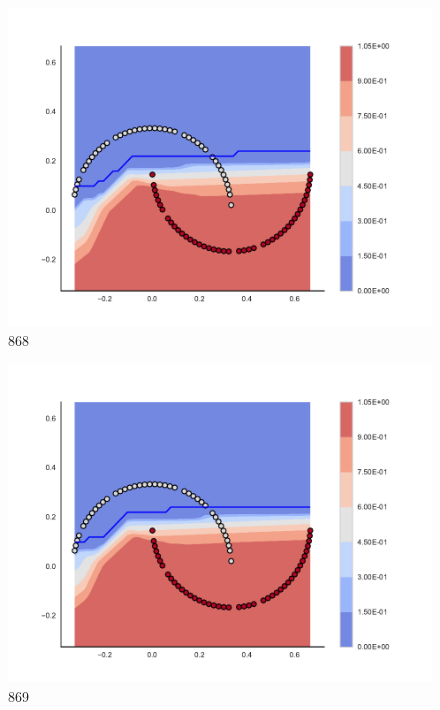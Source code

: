 \begin{subfigure}[b]{0.09\textwidth}
    \includegraphics[clip, trim=2.35cm 1.75cm 4.5cm 0cm,width=\textwidth]{img/convergence/868.pdf}
    \caption{868}
    \label{fig:convergence_868}
\end{subfigure}
%
\begin{subfigure}[b]{0.09\textwidth}
    \includegraphics[clip, trim=2.35cm 1.75cm 4.5cm 0cm,width=\textwidth]{img/convergence/869.pdf}
    \caption{869}
    \label{fig:convergence_869}
\end{subfigure}
%
